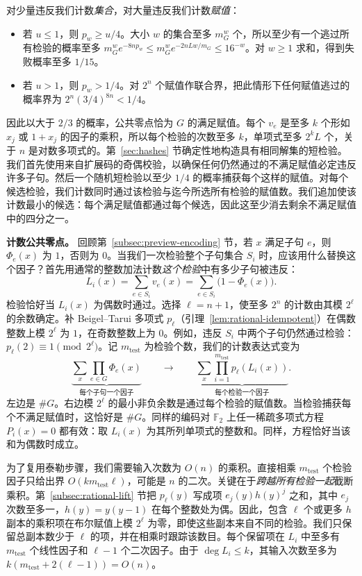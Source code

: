 \documentclass[11pt,reqno]{amsart}
\numberwithin{equation}{section}
\theoremstyle{definition}\newtheorem{definition}[theorem]{定义}
\theoremstyle{remark}\newtheorem{remark}[theorem]{注}
\renewcommand{\le}{\leqslant}
\renewcommand{\ge}{\geqslant}
\begin{document}
对少量违反我们计数\emph{集合}，对大量违反我们计数\emph{赋值}：
\begin{itemize}
\item 若 $u\le1$，则 $p_w\ge u/4$。大小 $w$ 的集合至多 $m_G^w$ 个，所以至少有一个逃过所有检验的概率至多 $m_G^w e^{-8np_w}\le m_G^w e^{-2nLw/m_G}\le16^{-w}$。对 $w\ge1$ 求和，得到失败概率至多 $1/15$。
\item 若 $u>1$，则 $p_w>1/4$。对 $2^n$ 个赋值作联合界，把此情形下任何赋值逃过的概率界为 $2^n(3/4)^{8n}<1/4$。
\end{itemize}
因此以大于 $2/3$ 的概率，公共零点恰为 $G$ 的满足赋值。每个 $v_e$ 是至多 $k$ 个形如 $x_j$ 或 $1+x_j$ 的因子的乘积，所以每个检验的次数至多 $k$，单项式至多 $2^kL$ 个，关于 $n$ 是对数多项式的。第~\ref{sec:hashes} 节确定性地构造具有相同解集的短检验。我们首先使用来自扩展码的奇偶校验，以确保任何仍然通过的不满足赋值必定违反许多子句。然后一个随机短检验以至少 $1/4$ 的概率捕获每个这样的赋值。对每个候选检验，我们计数同时通过该检验与迄今所选所有检验的赋值数。我们追加使该计数最小的候选：每个满足赋值都通过每个候选，因此这至少消去剩余不满足赋值中的四分之一。

\medskip\noindent
\textbf{计数公共零点。}
回顾第~\ref{subsec:preview-encoding} 节，若 $x$ 满足子句 $e$，则 $\Phi_e(x)$ 为 $1$，否则为 $0$。当我们一次检验整个子句集合 $S_i$ 时，应该用什么替换这个因子？首先用通常的整数加法计数\emph{这个检验}中有多少子句被违反：
\[
 L_i(x)=\sum_{e\in S_i}v_e(x)=\sum_{e\in S_i}\bigl(1-\Phi_e(x)\bigr).
\]
检验恰好当 $L_i(x)$ 为偶数时通过。选择 $\ell=n+1$，使至多 $2^n$ 的计数由其模 $2^\ell$ 的余数确定。补 Beigel--Tarui 多项式 $p_\ell$（引理~\ref{lem:rational-idempotent}）在偶数整数上模 $2^\ell$ 为 $1$，在奇数整数上为 $0$。例如，违反 $S_i$ 中两个子句仍然通过检验：$p_\ell(2)\equiv1\pmod{2^\ell}$。记 $m_{\mathrm{test}}$ 为检验个数，我们的计数表达式变为
\[
 \underbrace{\sum_x\prod_{e\in G}\Phi_e(x)}_{\text{每个子句一个因子}}
 \qquad\longrightarrow\qquad
 \underbrace{\sum_x\prod_{i=1}^{m_{\mathrm{test}}} p_\ell(L_i(x))}_{\text{每个检验一个因子}}.
\]
左边是 $\#G$。右边模 $2^\ell$ 的最小非负余数是通过每个检验的赋值数。当检验捕获每个不满足赋值时，这恰好是 $\#G$。同样的编码对 $\mathbb F_2$ 上任一稀疏多项式方程 $P_i(x)=0$ 都有效：取 $L_i(x)$ 为其所列单项式的整数和。同样，方程恰好当该和为偶数时成立。

为了复用泰勒步骤，我们需要输入次数为 $O(n)$ 的乘积。直接相乘 $m_{\mathrm{test}}$ 个检验因子只给出界 $O(km_{\mathrm{test}}\ell)$，可能是 $n$ 的二次。关键在于\emph{跨越所有检验一起}截断乘积。第~\ref{subsec:rational-lift} 节把 $p_\ell(y)$ 写成项 $e_j(y)h(y)^j$ 之和，其中 $e_j$ 次数至多一，$h(y)=y(y-1)$ 在每个整数处为偶。因此，包含 $\ell$ 个或更多 $h$ 副本的乘积项在布尔赋值上模 $2^\ell$ 为零，即使这些副本来自不同的检验。我们只保留总副本数少于 $\ell$ 的项，并在相乘时跟踪该数目。每个保留项在 $L_i$ 中至多有 $m_{\mathrm{test}}$ 个线性因子和 $\ell-1$ 个二次因子。由于 $\deg L_i\le k$，其输入次数至多为 $k(m_{\mathrm{test}}+2(\ell-1))=O(n)$。
\end{document}
